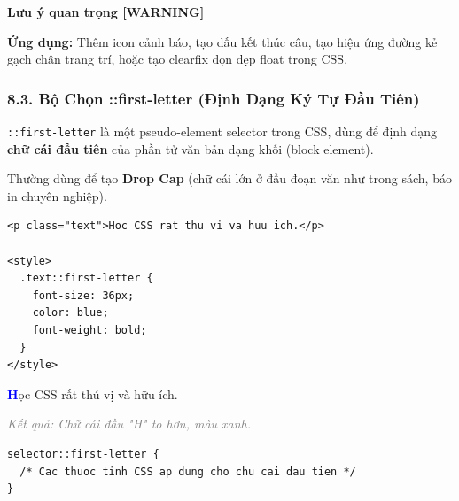 \documentclass[11pt,oneside]{book}
\newcommand{\codeinline}[1]{\textcolor{accentOrange}{\texttt{#1}}}
\newcommand{\term}[1]{\textbf{\textcolor{primaryBlue}{#1}}}
\begin{document}
\begin{browserWindow}
\sffamily\large\bfseries
Lưu ý quan trọng [WARNING]
\end{browserWindow}

\begin{conceptBox}
\textbf{Ứng dụng:} Thêm icon cảnh báo, tạo dấu kết thúc câu, tạo hiệu ứng đường kẻ gạch chân trang trí, hoặc tạo clearfix dọn dẹp float trong CSS.
\end{conceptBox}

\subsubsection{8.3. Bộ Chọn ::first-letter (Định Dạng Ký Tự Đầu Tiên)}

\begin{conceptBox}
\codeinline{::first-letter} là một pseudo-element selector trong CSS, dùng để định dạng \textbf{chữ cái đầu tiên} của phần tử văn bản dạng khối (block element).
\par\vspace{4pt}
Thường dùng để tạo \term{Drop Cap} (chữ cái lớn ở đầu đoạn văn như trong sách, báo in chuyên nghiệp).
\end{conceptBox}

\begin{codeWindow}
\begin{lstlisting}[language=HTML5]
<p class="text">Hoc CSS rat thu vi va huu ich.</p>

<style>
  .text::first-letter {
    font-size: 36px;
    color: blue;
    font-weight: bold;
  }
</style>
\end{lstlisting}
\end{codeWindow}

\begin{browserWindow}
\sffamily\small
\textbf{\Large\textcolor{blue}{H}}ọc CSS rất thú vị và hữu ích. \par\vspace{2pt}
{\scriptsize\textcolor{gray}{\textit{Kết quả: Chữ cái đầu "H" to hơn, màu xanh.}}}
\end{browserWindow}

\begin{codeWindow}
\begin{lstlisting}[language=CSS3]
selector::first-letter {
  /* Cac thuoc tinh CSS ap dung cho chu cai dau tien */
}
\end{lstlisting}
\end{codeWindow}
\end{document}
